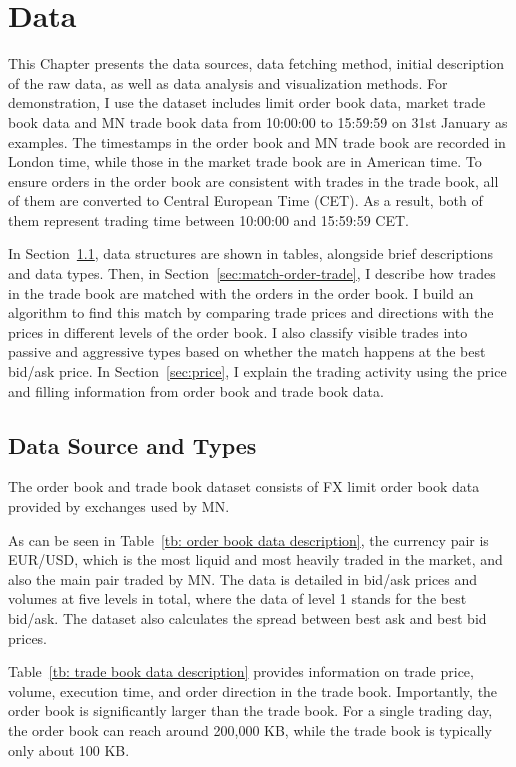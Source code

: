 \chapter{Data} \label{chapter:preliminary}
This Chapter presents the data sources, data fetching method, initial description of the raw data, as well as data analysis and visualization methods. For demonstration, I use the dataset includes limit order book data, market trade book data and MN trade book data from 10:00:00 to 15:59:59 on 31st January as examples. The timestamps in the order book and MN trade book are recorded in London time, while those in the market trade book are in American time. To ensure orders in the order book are consistent with trades in the trade book, all of them are converted to Central European Time (CET). As a result, both of them represent trading time between 10:00:00 and 15:59:59 CET. 

In Section~\ref{sec:data-source}, data structures are shown in tables, alongside brief descriptions and data types. Then, in Section~\ref{sec:match-order-trade}, I describe how trades in the trade book are matched with the orders in the order book. I build an algorithm to find this match by comparing trade prices and directions with the prices in different levels of the order book. I also classify visible trades into passive and aggressive types based on whether the match happens at the best bid/ask price. 
In Section~\ref{sec:price}, I explain the trading activity using the price and filling information from order book and trade book data. 


\section{Data Source and Types} \label{sec:data-source}
The order book and trade book dataset consists of FX limit order book data provided by exchanges used by MN. 

As can be seen in Table~\ref{tb: order book data description}, the currency pair is EUR/USD, which is the most liquid and most heavily traded in the market, and also the main pair traded by MN. The data is detailed in bid/ask prices and volumes at five levels in total, where the data of level 1 stands for the best bid/ask. The dataset also calculates the spread between best ask and best bid prices.

Table~\ref{tb: trade book data description} provides information on trade price, volume, execution time, and order direction in the trade book. Importantly, the order book is significantly larger than the trade book. For a single trading day, the order book can reach around 200,000 KB, while the trade book is typically only about 100 KB.


